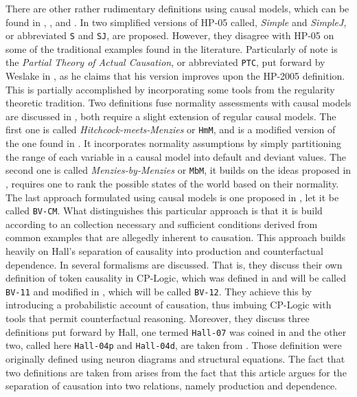\documentclass[11pt,a4paper]{book}
\theoremstyle{definition}
\theoremstyle{definition}
\theoremstyle{definition}
\theoremstyle{remark}
\begin{document}
There are other rather rudimentary definitions using causal models, which can be found in \parencite{halpern2011actual}, \parencite{halpern2015graded}, \parencite{schaffer2016grounding} and \parencite{weslake2015partial}. 
In \parencite{glymour2010actual} two simplified versions of HP-05 called, \emph{Simple} and \emph{SimpleJ}, or abbreviated \texttt{S} and \texttt{SJ}, are proposed. However, they disagree with HP-05 on some of the traditional examples found in the literature. 
Particularly of note is the \emph{Partial Theory of Actual Causation},  or abbreviated \texttt{PTC}, put forward by Weslake in \parencite{weslake2015partial}, as he claims that his version improves upon the HP-2005 definition. This is partially accomplished by incorporating some tools from the regularity theoretic tradition.
Two definitions fuse normality assessments with causal models are discussed in \parencite{blanchard2017cause}, both require a slight extension of regular causal models. The first one is called \emph{Hitchcock-meets-Menzies} or \texttt{HmM}, and is a modified version of the one found in \parencite{hitchcock2007prevention}. It incorporates normality assumptions by simply partitioning the range of each variable in a causal model into default and deviant values. 
The second one is called \emph{Menzies-by-Menzies} or \texttt{MbM}, it builds on the ideas proposed in \parencite{menzies2007causation}, requires one to rank the possible states of the world based on their normality. 
The last approach formulated using causal models is one proposed in \parencite{beckers2018principled}, let it be called \texttt{BV-CM}. What distinguishes this particular approach is that it is build according to an collection necessary and sufficient conditions derived from common examples that are allegedly inherent to causation. This approach builds heavily on Hall's separation of causality into production and counterfactual dependence. 
In \parencite{beckers2016general} several formalisms are discussed. That is, they discuss their own definition of token causality in CP-Logic, which was defined in \parencite{vennekens2011actual} and will be called \texttt{BV-11} and modified in \parencite{beckers2012counterfactual}, which will be called \texttt{BV-12}. They achieve this by introducing a probabilistic account of causation, thus imbuing CP-Logic with tools that permit counterfactual reasoning.
Moreover, they discuss three definitions put forward by Hall, one termed \texttt{Hall-07} was coined in \parencite{hall2007structural} and the other two, called here \texttt{Hall-04p} and \texttt{Hall-04d}, are taken from \parencite{hall2004two}. Those definition were originally defined using neuron diagrams and structural equations. The fact that two definitions are taken from \parencite{hall2004two} arises from the fact that this article argues for the separation of causation into two relations, namely production and dependence.
\end{document}
